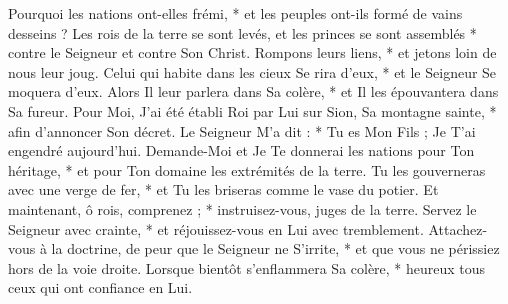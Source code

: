  Pourquoi les nations ont-elles frémi, * et les peuples ont-ils formé de vains desseins ?
\versseparator
 Les rois de la terre se sont levés, et les princes se sont assemblés * contre le Seigneur et contre Son Christ.
\versseparator
 Rompons leurs liens, * et jetons loin de nous leur joug.
\versseparator
 Celui qui habite dans les cieux Se rira d'eux, * et le Seigneur Se moquera d'eux.
\versseparator
 Alors Il leur parlera dans Sa colère, * et Il les épouvantera dans Sa fureur.
\versseparator
 Pour Moi, J'ai été établi Roi par Lui sur Sion, Sa montagne sainte, * afin d'annoncer Son décret.
\versseparator
 Le Seigneur M'a dit : * Tu es Mon Fils ; Je T'ai engendré aujourd'hui.
\versseparator
 Demande-Moi et Je Te donnerai les nations pour Ton héritage, * et pour Ton domaine les extrémités de la terre.
\versseparator
 Tu les gouverneras avec une verge de fer, * et Tu les briseras comme le vase du potier.
\versseparator
 Et maintenant, ô rois, comprenez ; * instruisez-vous, juges de la terre.
\versseparator
 Servez le Seigneur avec crainte, * et réjouissez-vous en Lui avec tremblement.
\versseparator
 Attachez-vous à la doctrine, de peur que le Seigneur ne S'irrite, * et que vous ne périssiez hors de la voie droite.
\versseparator
 Lorsque bientôt s'enflammera Sa colère, * heureux tous ceux qui ont confiance en Lui.